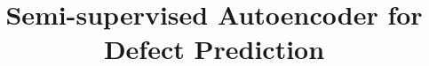\documentclass{sig-alternate-05-2015}
\begin{document}


%
%
%

%

\title{Semi-supervised Autoencoder for Defect Prediction}
%
%
%
%
%
\end{document}
